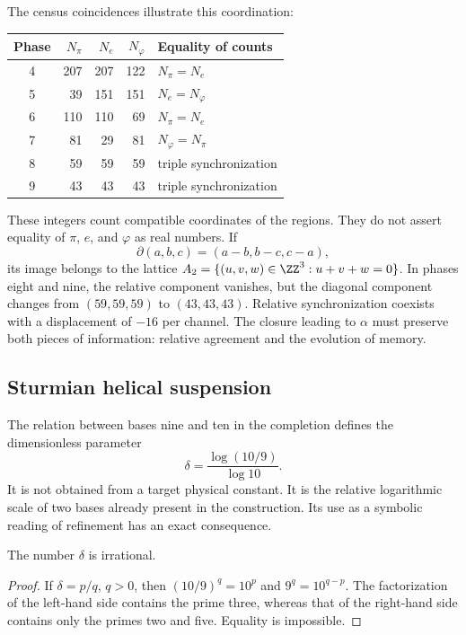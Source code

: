 The census coincidences illustrate this coordination:
\begin{center}
\begin{tabular}{@{}c rrr l@{}}\toprule
Phase&\(N_\pi\)&\(N_e\)&\(N_\varphi\)&Equality of counts\\\midrule
4&207&207&122&\(N_\pi=N_e\)\\
5&39&151&151&\(N_e=N_\varphi\)\\
6&110&110&69&\(N_\pi=N_e\)\\
7&81&29&81&\(N_\varphi=N_\pi\)\\
8&59&59&59&triple synchronization\\
9&43&43&43&triple synchronization\\\bottomrule
\end{tabular}
\end{center}
These integers count compatible coordinates of the regions. They do not assert equality of \(\pi\), \(e\), and \(\varphi\) as real numbers. If
\[
 \partial(a,b,c)=(a-b,b-c,c-a),
\]
its image belongs to the lattice \(A_2=\{(u,v,w)\in\ZZ^3:u+v+w=0\}\). In phases eight and nine, the relative component vanishes, but the diagonal component changes from \((59,59,59)\) to \((43,43,43)\). Relative synchronization coexists with a displacement of \(-16\) per channel. The closure leading to \(\alpha\) must preserve both pieces of information: relative agreement and the evolution of memory.

\subsection{Sturmian helical suspension}

The relation between bases nine and ten in the completion defines the dimensionless parameter
\begin{equation}
 \delta=\frac{\log(10/9)}{\log10}.
 \label{eq:delta-sturm}
\end{equation}
It is not obtained from a target physical constant. It is the relative logarithmic scale of two bases already present in the construction. Its use as a symbolic reading of refinement has an exact consequence.

\begin{lemma}
The number \(\delta\) is irrational.
\end{lemma}
\begin{proof}
If \(\delta=p/q\), \(q>0\), then \((10/9)^q=10^p\) and \(9^q=10^{q-p}\). The factorization of the left-hand side contains the prime three, whereas that of the right-hand side contains only the primes two and five. Equality is impossible.
\end{proof}

